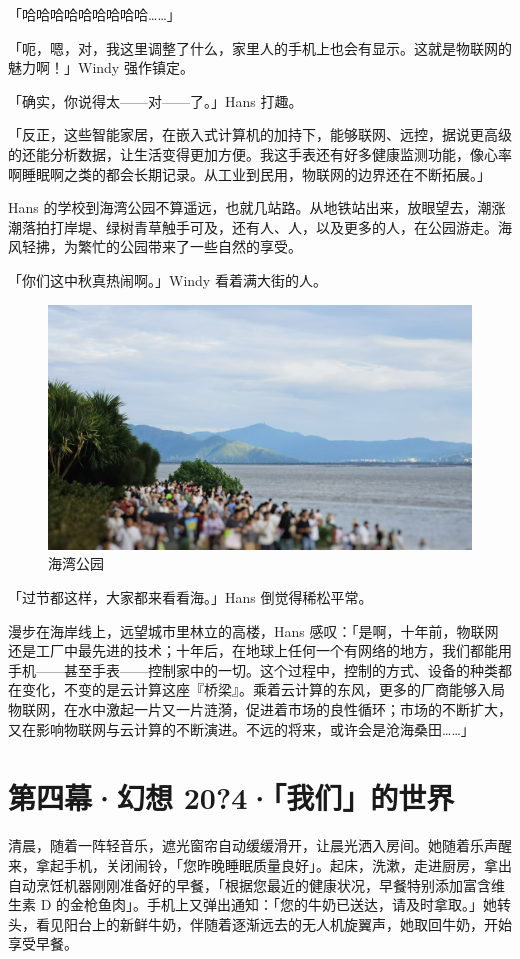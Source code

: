 「哈哈哈哈哈哈哈哈哈……」

「呃，嗯，对，我这里调整了什么，家里人的手机上也会有显示。这就是物联网的魅力啊！」Windy 强作镇定。

「确实，你说得太——对——了。」Hans 打趣。

「反正，这些智能家居，在嵌入式计算机的加持下，能够联网、远控，据说更高级的还能分析数据，让生活变得更加方便。我这手表还有好多健康监测功能，像心率啊睡眠啊之类的都会长期记录。从工业到民用，物联网的边界还在不断拓展。」

Hans 的学校到海湾公园不算遥远，也就几站路。从地铁站出来，放眼望去，潮涨潮落拍打岸堤、绿树青草触手可及，还有人、人，以及更多的人，在公园游走。海风轻拂，为繁忙的公园带来了一些自然的享受。

「你们这中秋真热闹啊。」Windy 看着满大街的人。

\begin{figure}[htb!]
  \centering
  \includegraphics[width=.7\textwidth]{assets/surpass/The_seaside_park.jpg}
  \caption{海湾公园}
  \label{fig:The_seaside_park}
\end{figure}

「过节都这样，大家都来看看海。」Hans 倒觉得稀松平常。

漫步在海岸线上，远望城市里林立的高楼，Hans 感叹：「是啊，十年前，物联网还是工厂中最先进的技术；十年后，在地球上任何一个有网络的地方，我们都能用手机——甚至手表——控制家中的一切。这个过程中，控制的方式、设备的种类都在变化，不变的是云计算这座『桥梁』。乘着云计算的东风，更多的厂商能够入局物联网，在水中激起一片又一片涟漪，促进着市场的良性循环；市场的不断扩大，又在影响物联网与云计算的不断演进。不远的将来，或许会是沧海桑田……」

\section{第四幕·幻想 20?4·「我们」的世界}

清晨，随着一阵轻音乐，遮光窗帘自动缓缓滑开，让晨光洒入房间。她随着乐声醒来，拿起手机，关闭闹铃，「您昨晚睡眠质量良好」。起床，洗漱，走进厨房，拿出自动烹饪机器刚刚准备好的早餐，「根据您最近的健康状况，早餐特别添加富含维生素 D 的金枪鱼肉」。手机上又弹出通知：「您的牛奶已送达，请及时拿取。」她转头，看见阳台上的新鲜牛奶，伴随着逐渐远去的无人机旋翼声，她取回牛奶，开始享受早餐。

